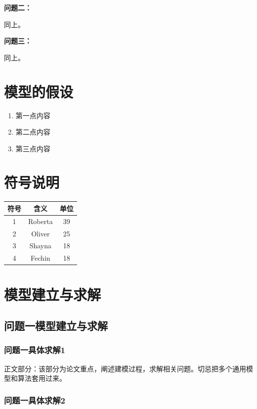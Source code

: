 \documentclass{cumcm}
\begin{document}
\textbf{问题二：}

同上。

\textbf{问题三：}

同上。


\section{模型的假设}

\begin{enumerate}
	\item 第一点内容
	\item 第二点内容
	\item 第三点内容
\end{enumerate}

\section{符号说明}

\begin{table}[H]
    \centering
    \begin{tabular}{ccc}
    \toprule
        \textbf{符号} & \textbf{含义} & \textbf{单位} \\
    \midrule
        1 & Roberta & 39 \\ 
        2 & Oliver & 25 \\ 
        3 & Shayna & 18 \\ 
        4 & Fechin & 18 \\ 
    \bottomrule
    \end{tabular}
\end{table}

\section{模型建立与求解}

\subsection{问题一模型建立与求解}

\subsubsection{问题一具体求解1}

正文部分：该部分为论文重点，阐述建模过程，求解相关问题。切忌把多个通用模型和算法套用过来。
\subsubsection{问题一具体求解2}
\end{document}
